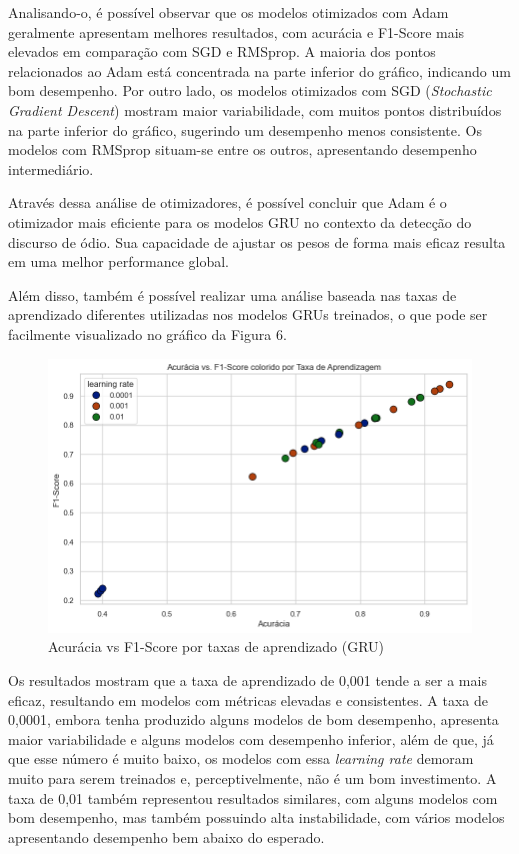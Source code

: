 \documentclass[conference]{IEEEtran}
\begin{document}
Analisando-o, é possível observar que os modelos otimizados com Adam geralmente apresentam melhores resultados, com acurácia e F1-Score mais elevados em comparação com SGD e RMSprop. A maioria dos pontos relacionados ao Adam está concentrada na parte inferior do gráfico, indicando um bom desempenho. Por outro lado, os modelos otimizados com SGD (\textit{Stochastic Gradient Descent}) mostram maior variabilidade, com muitos pontos distribuídos na parte inferior do gráfico, sugerindo um desempenho menos consistente. Os modelos com RMSprop situam-se entre os outros, apresentando desempenho intermediário.

Através dessa análise de otimizadores, é possível concluir que Adam é o otimizador mais eficiente para os modelos GRU no contexto da detecção do discurso de ódio. Sua capacidade de ajustar os pesos de forma mais eficaz resulta em uma melhor performance global.

Além disso, também é possível realizar uma análise baseada nas taxas de aprendizado diferentes utilizadas nos modelos GRUs treinados, o que pode ser facilmente visualizado no gráfico da Figura 6.

\begin{figure}[h!]
    \centering
    \includegraphics[width=\linewidth]{images/gru-lr.png}
    \caption{Acurácia vs F1-Score por taxas de aprendizado (GRU)}
    \label{fig:exemplo5}
\end{figure}

Os resultados mostram que a taxa de aprendizado de 0,001 tende a ser a mais eficaz, resultando em modelos com métricas elevadas e consistentes. A taxa de 0,0001, embora tenha produzido alguns modelos de bom desempenho, apresenta maior variabilidade e alguns modelos com desempenho inferior, além de que, já que esse número é muito baixo, os modelos com essa \textit{learning rate} demoram muito para serem treinados e, perceptivelmente, não é um bom investimento. A taxa de 0,01 também representou resultados similares, com alguns modelos com bom desempenho, mas também possuindo alta instabilidade, com vários modelos apresentando desempenho bem abaixo do esperado.
\end{document}
